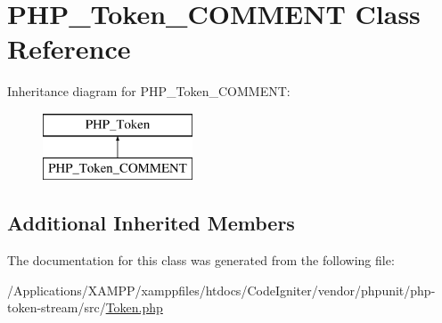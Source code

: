 \hypertarget{class_p_h_p___token___c_o_m_m_e_n_t}{}\section{P\+H\+P\+\_\+\+Token\+\_\+\+C\+O\+M\+M\+E\+NT Class Reference}
\label{class_p_h_p___token___c_o_m_m_e_n_t}
Inheritance diagram for P\+H\+P\+\_\+\+Token\+\_\+\+C\+O\+M\+M\+E\+NT\+:\begin{figure}[H]
\begin{center}
\leavevmode
\includegraphics[height=2.000000cm]{class_p_h_p___token___c_o_m_m_e_n_t}
\end{center}
\end{figure}
\subsection*{Additional Inherited Members}


The documentation for this class was generated from the following file\+:\begin{DoxyCompactItemize}
\item 
/\+Applications/\+X\+A\+M\+P\+P/xamppfiles/htdocs/\+Code\+Igniter/vendor/phpunit/php-\/token-\/stream/src/\mbox{\hyperlink{_token_8php}{Token.\+php}}\end{DoxyCompactItemize}
